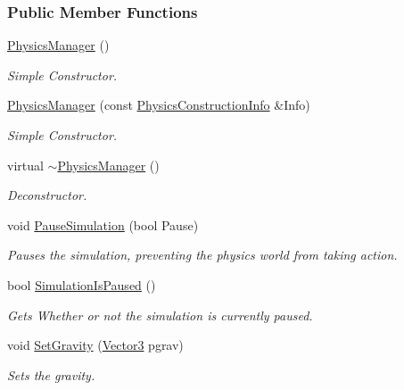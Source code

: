 \subsubsection*{Public Member Functions}
\begin{DoxyCompactItemize}
\item 
\hyperlink{classphys_1_1PhysicsManager_ab3ecdc295799ad9858ca80743b25006d}{PhysicsManager} ()
\begin{DoxyCompactList}\small\item\em Simple Constructor. \item\end{DoxyCompactList}\item 
\hyperlink{classphys_1_1PhysicsManager_abb3bd1e6aaadba95ce219d9d3643ebfe}{PhysicsManager} (const \hyperlink{classphys_1_1PhysicsConstructionInfo}{PhysicsConstructionInfo} \&Info)
\begin{DoxyCompactList}\small\item\em Simple Constructor. \item\end{DoxyCompactList}\item 
virtual \hyperlink{classphys_1_1PhysicsManager_a4898702f889c6b4aa7c0b59991d310b0}{$\sim$PhysicsManager} ()
\begin{DoxyCompactList}\small\item\em Deconstructor. \item\end{DoxyCompactList}\item 
void \hyperlink{classphys_1_1PhysicsManager_a107d5540a9bef91325807f77542c9176}{PauseSimulation} (bool Pause)
\begin{DoxyCompactList}\small\item\em Pauses the simulation, preventing the physics world from taking action. \item\end{DoxyCompactList}\item 
bool \hyperlink{classphys_1_1PhysicsManager_a62e19a64f13c5dff40a6f454331dae70}{SimulationIsPaused} ()
\begin{DoxyCompactList}\small\item\em Gets Whether or not the simulation is currently paused. \item\end{DoxyCompactList}\item 
void \hyperlink{classphys_1_1PhysicsManager_a3e74f3e0288706d44dc90657a8fa1118}{SetGravity} (\hyperlink{classphys_1_1Vector3}{Vector3} pgrav)
\begin{DoxyCompactList}\small\item\em Sets the gravity. \item\end{DoxyCompactList}\item 

\end{DoxyCompactItemize}
